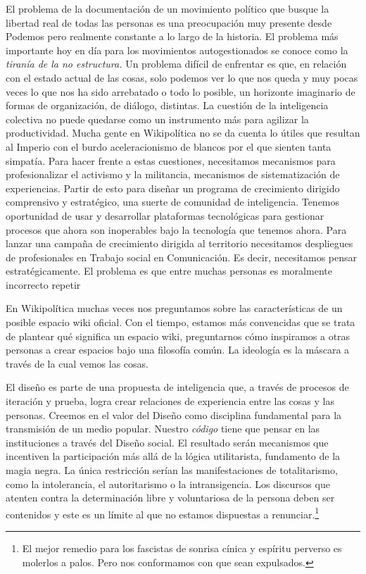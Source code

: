 El problema de la documentación de un movimiento político que busque la libertad real de todas las personas es una preocupación muy presente desde Podemos pero realmente constante a lo largo de la historia. El problema más importante hoy en día para los movimientos autogestionados se conoce como la \emph{tiranía de la no estructura.} Un problema difícil de enfrentar es que, en relación con el estado actual de las cosas, solo podemos ver lo que nos queda y muy pocas veces lo que nos ha sido arrebatado o todo lo posible, un horizonte imaginario de formas de organización, de diálogo, distintas. La cuestión de la inteligencia colectiva no puede quedarse como un instrumento más para agilizar la productividad. Mucha gente en Wikipolítica no se da cuenta lo útiles que resultan al Imperio con el burdo aceleracionismo de blancos por el que sienten tanta simpatía. Para hacer frente a estas cuestiones, necesitamos mecanismos para profesionalizar el activismo y la militancia, mecanismos de sistematización de experiencias. Partir de esto para diseñar un programa de crecimiento dirigido comprensivo y estratégico, una suerte de comunidad de inteligencia. Tenemos oportunidad de usar y desarrollar plataformas tecnológicas para gestionar procesos que ahora son inoperables bajo la tecnología que tenemos ahora. Para lanzar una campaña de crecimiento dirigida al territorio necesitamos despliegues de profesionales en Trabajo social en Comunicación. Es decir, necesitamos pensar estratégicamente. El problema es que entre muchas personas es moralmente incorrecto repetir

En Wikipolítica muchas veces nos preguntamos sobre las características de un posible espacio wiki oficial. Con el tiempo, estamos más convencidas que se trata de plantear qué significa un espacio wiki, preguntarnos cómo inspiramos a otras personas a crear espacios bajo una filosofía común. La ideología es la máscara a través de la cual vemos las cosas.

El diseño es parte de una propuesta de inteligencia que, a través de procesos de iteración y prueba, logra crear relaciones de experiencia entre las cosas y las personas. Creemos en el valor del Diseño como disciplina fundamental para la transmisión de un medio popular. Nuestro \emph{código} tiene que pensar en las instituciones a través del Diseño social. El resultado serán mecanismos que incentiven la participación más allá de la lógica utilitarista, fundamento de la magia negra. La única restricción serían las manifestaciones de totalitarismo, como la intolerancia, el autoritarismo o la intransigencia. Los discursos que atenten contra la determinación libre y voluntariosa de la persona deben ser contenidos y este es un límite al que no estamos dispuestas a renunciar.\footnote{El mejor remedio para los fascistas de sonrisa cínica y espíritu perverso es molerlos a palos. Pero nos conformamos con que sean expulsados.}

